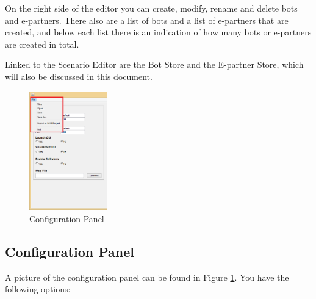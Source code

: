 On the right side of the editor you can create, modify, rename and delete bots and e-partners. There also are a list of bots and a list of e-partners that are created, and below each list there is an indication of how many bots or e-partners are created in total.

Linked to the Scenario Editor are the Bot Store and the E-partner Store, which will also be discussed in this document.


\begin{figure}
  \begin{center}
	\includegraphics[width=0.3\textwidth]{ScenarioEditor/config.png}
  \end{center}
\caption{Configuration Panel}
\label{fig:ScenarioConfigPanel}
\end{figure}

\subsection{Configuration Panel}
A picture of the configuration panel can be found in Figure \ref{fig:ScenarioConfigPanel}. You have the following options:

